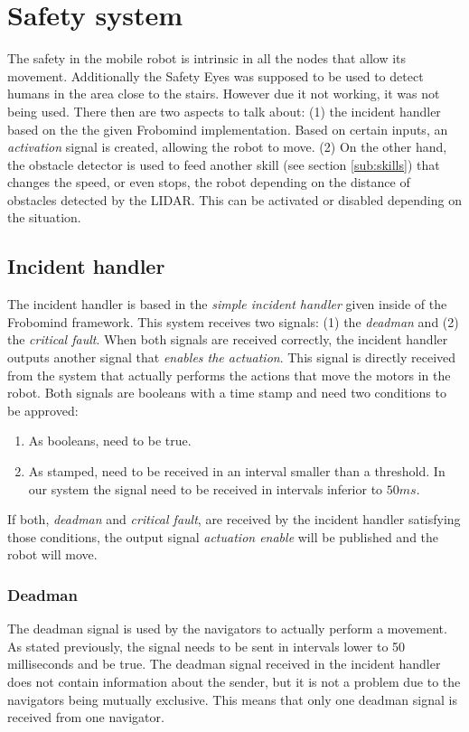 \section{Safety system} %
\label{sec:mr_safety_system}
The safety in the mobile robot is intrinsic in all the nodes that allow its movement.
Additionally the Safety Eyes was supposed to be used to detect humans in the area close to the stairs. However due it not working, it was not being used.
There then are two aspects to talk about: (1) the incident handler based on the the given Frobomind implementation. Based on certain inputs, an \emph{activation} signal is created, allowing the robot to move.
(2) On the other hand, the obstacle detector is used to feed another skill (see section \ref{sub:skills}) that changes the speed, or even stops, the robot depending on the distance of obstacles detected by the LIDAR.
This can be activated or disabled depending on the situation.
	\subsection{Incident handler} %
	\label{sub:mr_incident_handler}
	The incident handler is based in the \emph{simple incident handler} given inside of the Frobomind framework.
	This system receives two signals: (1) the \emph{deadman} and (2) the \emph{critical fault}.
	When both signals are received correctly, the incident handler outputs another signal that \emph{enables the actuation}.
	This signal is directly received from the system that actually performs the actions that move the motors in the robot.
	Both signals are booleans with a time stamp and need two conditions to be approved:
	\begin{enumerate}
		\item As booleans, need to be true.
		\item As stamped, need to be received in an interval smaller than a threshold. In our system the signal need to be received in intervals inferior to $50 ms$.
	\end{enumerate}
	If both, \emph{deadman} and \emph{critical fault}, are received by the incident handler satisfying those conditions, the output signal \emph{actuation enable} will be published and the robot will move.
		\subsubsection{Deadman} %
		\label{ssub:mr_deadman}
		The deadman signal is used by the navigators to actually perform a movement.
		As stated previously, the signal needs to be sent in intervals lower to 50 milliseconds and be true.
		The deadman signal received in the incident handler does not contain 
		information about the sender, but it is not a problem due to the 
		navigators being mutually exclusive.
		This means that only one deadman signal is received from one navigator.

